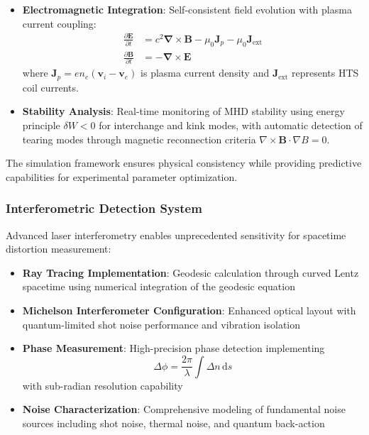 \documentclass[12pt,a4paper]{article}
\newcommand{\ddt}[1]{\frac{\partial #1}{\partial t}}
\newcommand{\curl}{\boldsymbol{\nabla} \times}
\newcommand{\dd}[1]{\,\mathrm{d}#1}
\begin{document}
\begin{itemize}
\item \textbf{Electromagnetic Integration}: Self-consistent field evolution with plasma current coupling:
\begin{align}
\ddt{\mathbf{E}} &= c^2 \curl \mathbf{B} - \mu_0 \mathbf{J}_p - \mu_0 \mathbf{J}_{\text{ext}} \\
\ddt{\mathbf{B}} &= -\curl \mathbf{E}
\end{align}
where $\mathbf{J}_p = en_e(\mathbf{v}_i - \mathbf{v}_e)$ is plasma current density and $\mathbf{J}_{\text{ext}}$ represents HTS coil currents.

\item \textbf{Stability Analysis}: Real-time monitoring of MHD stability using energy principle $\delta W < 0$ for interchange and kink modes, with automatic detection of tearing modes through magnetic reconnection criteria $\nabla \times \mathbf{B} \cdot \nabla B = 0$.
\end{itemize}

The simulation framework ensures physical consistency while providing predictive capabilities for experimental parameter optimization.

\subsubsection{Interferometric Detection System}

Advanced laser interferometry enables unprecedented sensitivity for spacetime distortion measurement:

\begin{itemize}
\item \textbf{Ray Tracing Implementation}: Geodesic calculation through curved Lentz spacetime using numerical integration of the geodesic equation
\item \textbf{Michelson Interferometer Configuration}: Enhanced optical layout with quantum-limited shot noise performance and vibration isolation
\item \textbf{Phase Measurement}: High-precision phase detection implementing 
\begin{equation}
\Delta\phi = \frac{2\pi}{\lambda} \int \Delta n \dd{s}
\end{equation}
with sub-radian resolution capability
\item \textbf{Noise Characterization}: Comprehensive modeling of fundamental noise sources including shot noise, thermal noise, and quantum back-action
\end{itemize}
\end{document}
